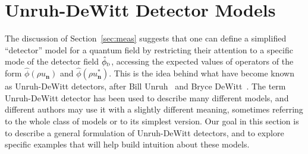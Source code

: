 \documentclass[letterpaper,12pt,titlepage,oneside,final]{book}
\newcommand{\M}{\mathcal{M}}
\newcommand{\mf}{\mathsf}%
\newcommand{\ii}{\mathrm{i}}
\newcommand{\tc}[1]{\textsc{#1}}
\begin{document}




\section{Unruh-DeWitt Detector Models}\label{sec:UDW}

The discussion of Section~\ref{sec:meas} suggests that one can define a simplified ``detector'' model for a quantum field by restricting their attention to a specific mode of the detector field $\hat{\phi}_\tc{d}$, accessing the expected values of operators of the form $\hat{\phi}(\rho u_{\bm n})$ and $\hat{\phi}(\rho u_{\bm n}^*)$. This is the idea behind what have become known as Unruh-DeWitt detectors, after Bill Unruh~\cite{Unruh1976} and Bryce DeWitt~\cite{DeWitt}. The term Unruh-DeWitt detector has been used to describe many different models, and different authors may use it with a slightly different meaning, sometimes referring to the whole class of models or to its simplest version. Our goal in this section is to describe a general formulation of Unruh-DeWitt detectors, and to explore specific examples that will help build intuition about these models.
\end{document}
